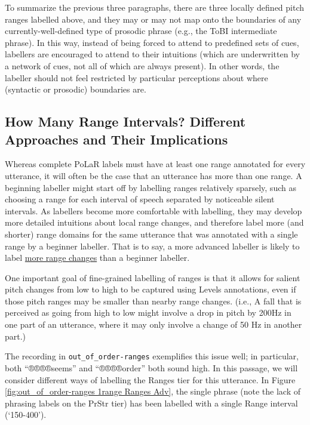 \documentclass[11pt, twoside]{memoir}
\begin{document}
To summarize the previous three paragraphs, there are three locally defined pitch ranges labelled above, and they may or may not map onto the boundaries of any currently-well-defined type of prosodic phrase (e.g., the ToBI intermediate phrase). In this way, instead of being forced to attend to predefined sets of cues, labellers are encouraged to attend to their intuitions (which are underwritten by a network of cues, not all of which are always present). In other words, the labeller should not feel restricted by particular perceptions about where (syntactic or prosodic) boundaries are.

\subsection{How Many Range Intervals? Different Approaches and Their Implications}\label{sec:how-many-range-intervals-different-approaches-and-their-implications}

Whereas complete PoLaR labels must have at least one range annotated for every utterance, it will often be the case that an utterance has more than one range. A beginning labeller might start off by labelling ranges relatively sparsely, such as choosing a range for each interval of speech separated by noticeable silent intervals. As labellers become more comfortable with labelling, they may develop more detailed intuitions about local range changes, and therefore label more (and shorter) range domains for the same utterance that was annotated with a single range by a beginner labeller. That is to say, a more advanced labeller is likely to label \uline{more range changes} than a beginner labeller.

One important goal of fine-grained labelling of ranges is that it allows for salient pitch changes from low to high to be captured using Levels annotations, even if those pitch ranges may be smaller than nearby range changes. (i.e., A fall that is perceived as going from high to low might involve a drop in pitch by 200Hz in one part of an utterance, where it may only involve a change of 50 Hz in another part.)

The recording in \texttt{out\_of\_order-ranges} exemplifies this issue well; in particular, both “®®®®{seems}” and “®®®®{order}” both sound high.  In this passage, we will consider different ways of labelling the Ranges tier for this utterance. In Figure \ref{fig:out_of_order-ranges 1range Ranges Adv}, the single phrase (note the lack of phrasing labels on the PrStr tier) has been labelled with a single Range interval (‘150-400’).
\end{document}
